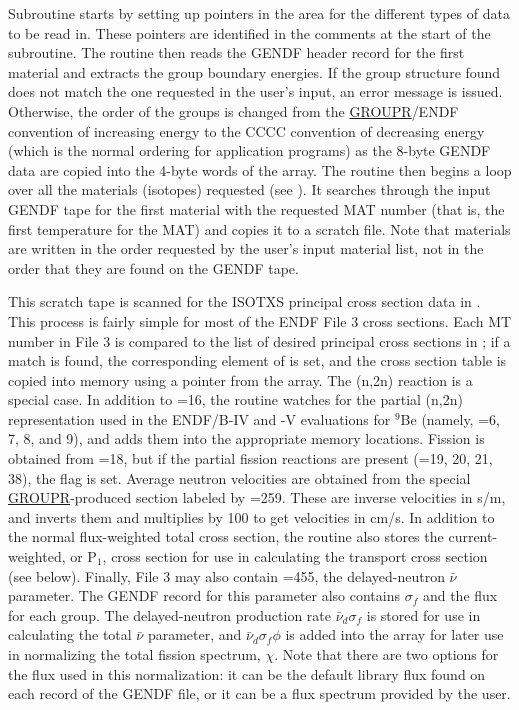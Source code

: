 Subroutine  starts by
setting up pointers in the  area for the different
types of data to be read in.  These pointers are identified in the
comments at the start of the subroutine.  The routine then reads
the GENDF header record for the first material and extracts
the group boundary energies.  If the group structure found does
not match the one requested in the user's input, an error message
is issued.  Otherwise, the order of the groups is changed from
the \hyperlink{sGROUPRhy}{GROUPR}/ENDF convention
of increasing energy to the
CCCC convention of decreasing energy (which is the normal ordering for
application programs) as the 8-byte GENDF data are copied into the
4-byte words of the  array.  The routine then begins a loop
over all the materials (isotopes) requested (see ).
It searches through the input GENDF tape for the first material with
the requested MAT number (that is, the first temperature for the MAT)
and copies it to a scratch file.  Note that materials are written in the
order requested by the user's input material list, not in the
order that they are found on the GENDF tape.

This scratch tape is scanned for the ISOTXS principal cross section data
in .  This process is fairly
simple for most of the ENDF File 3 cross sections.  Each MT number
in File 3 is compared to the list of desired principal cross sections
in ; if a match is found, the corresponding element
of  is set, and the cross section table is copied
into memory using a pointer from the  array.
The (n,2n) reaction is a special case.  In addition to =16, the
routine watches for the partial (n,2n) representation used in the
ENDF/B-IV and -V evaluations for $^9$Be (namely, =6, 7, 8, and 9),
and adds them into the appropriate memory locations.  Fission is
obtained from =18, but if the partial fission reactions are present
(=19, 20, 21, 38), the flag  is set.  Average neutron
velocities are obtained from the special
\hyperlink{sGROUPRhy}{GROUPR}-produced section labeled
by =259.  These are inverse velocities in s/m, and 
inverts them and multiplies by 100 to get velocities in cm/s.  In
addition to the normal flux-weighted total cross section, the routine
also stores the current-weighted, or P$_1$, cross section for use in
calculating the transport cross section (see below).  Finally, File 3
may also contain =455, the delayed-neutron $\bar{\nu}$ parameter.
The GENDF record for this parameter also contains $\sigma_f$ and the
flux for each group.  The delayed-neutron production rate
$\bar{\nu}_d\sigma_f$ is stored for use in calculating the total
$\bar{\nu}$ parameter, and $\bar{\nu}_d\sigma_f\phi$ is added into
the  array for later use in normalizing the total fission
spectrum, $\chi$.  Note that there are two options for the flux used
in this normalization: it can be the default library flux found on each
record of the GENDF file, or it can be a flux spectrum 
provided by the user.

